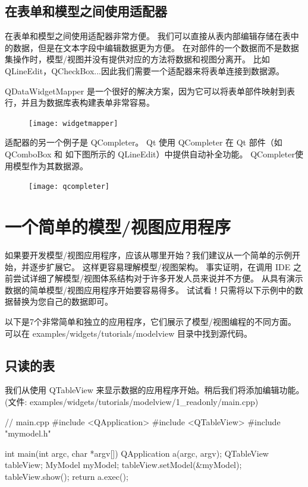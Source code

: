 \subsection{在表单和模型之间使用适配器}

在表单和模型之间使用适配器非常方便。
我们可以直接从表内部编辑存储在表中的数据，但是在文本字段中编辑数据更为方便。
在对部件的一个数据而不是数据集操作时，模型/视图并没有提供对应的方法将数据和视图分离开。
比如 QLineEdit，QCheckBox...因此我们需要一个适配器来将表单连接到数据源。

QDataWidgetMapper 是一个很好的解决方案，因为它可以将表单部件映射到表行，并且为数据库表构建表单非常容易。

\begin{figure}[hbt!]  
\texttt{[image: widgetmapper]}
\end{figure}

适配器的另一个例子是 QCompleter。
Qt 使用 QCompleter 在 Qt 部件（如 QComboBox 和 如下图所示的 QLineEdit）中提供自动补全功能。
QCompleter使用模型作为其数据源。
	
\begin{figure}[hbt!]  
\texttt{[image: qcompleter]}
\end{figure}

\section{一个简单的模型/视图应用程序}

如果要开发模型/视图应用程序，应该从哪里开始？我们建议从一个简单的示例开始，并逐步扩展它。
这样更容易理解模型/视图架构。
事实证明，在调用 IDE 之前尝试详细了解模型/视图体系结构对于许多开发人员来说并不方便。
从具有演示数据的简单模型/视图应用程序开始要容易得多。
试试看！只需将以下示例中的数据替换为您自己的数据即可。

以下是7个非常简单和独立的应用程序，它们展示了模型/视图编程的不同方面。
可以在 examples/widgets/tutorials/modelview 目录中找到源代码。

\subsection{只读的表}

我们从使用 QTableView 来显示数据的应用程序开始。稍后我们将添加编辑功能。
(文件: examples/widgets/tutorials/modelview/1\_readonly/main.cpp)

\begin{cppcode}
// main.cpp
#include <QApplication>
#include <QTableView>
#include "mymodel.h"
	
int main(int argc, char *argv[])
{
	QApplication a(argc, argv);
	QTableView tableView;
	MyModel myModel;
	tableView.setModel(&myModel);
	tableView.show();
	return a.exec();
}
\end{cppcode}

